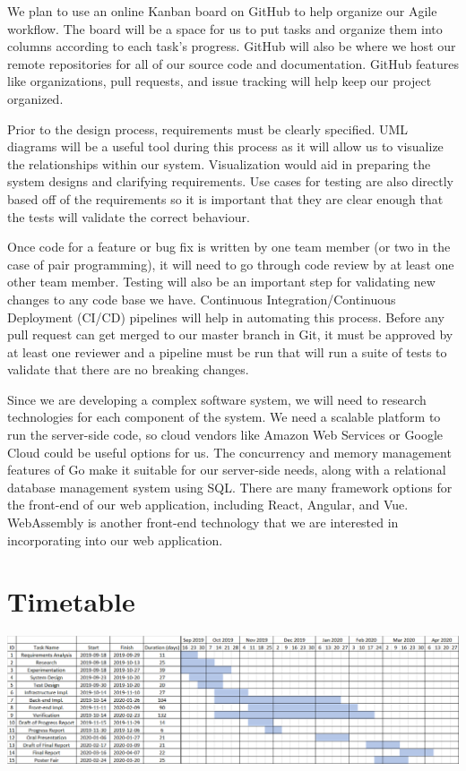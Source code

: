 \documentclass[letterpaper,12pt]{report}
\begin{document}
	We plan to use an online Kanban board on GitHub to help organize our Agile
	workflow. The board will be a space for us to put tasks and organize them
	into columns according to each task's progress. GitHub will also be where
	we host our remote repositories for all of our source code and
	documentation. GitHub features like organizations, pull requests, and issue
	tracking will help keep our project organized.

	Prior to the design process, requirements must be clearly specified. UML
	diagrams will be a useful tool during this process as it will allow us
	to visualize the relationships within our system. Visualization would aid
	in preparing the system designs and clarifying requirements. Use cases for
	testing are also directly based off of the requirements so it is important
	that they are clear enough that the tests will validate the correct
	behaviour.

	Once code for a feature or bug fix is written by one team member (or two in
	the case of pair programming), it will need to go through code review by at
	least one other team member. Testing will also be an important step for
	validating new changes to any code base we have. Continuous
	Integration/Continuous Deployment (CI/CD) pipelines will help in automating
	this process. Before any pull request can get merged to our master branch
	in Git, it must be approved by at least one reviewer and a pipeline must be
	run that will run a suite of tests to validate that there are no breaking
	changes.

	Since we are developing a complex software system, we will need to research
	technologies for each component of the system. We need a scalable platform
	to run the server-side code, so cloud vendors like Amazon Web Services or
	Google Cloud could be useful options for us. The concurrency and memory
	management features of Go make it suitable for our server-side needs, along
	with a relational database management system using SQL. There are many
	framework options for the front-end of our web application, including
	React, Angular, and Vue. WebAssembly is another front-end technology that
	we are interested in incorporating into our web application.

	\section*{Timetable}
	\markright{}
	\includegraphics[width=\linewidth]{timetable.png}
\end{document}
